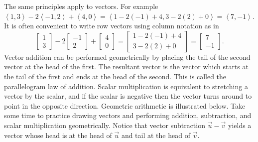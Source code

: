\documentclass[10pt]{article}
\begin{document}
The same principles apply to vectors. For example $\left<1,3\right>-2\left<-1,2\right>+\left<4,0\right> = \left<1-2(-1)+4,3-2(2)+0\right> = \left<7,-1\right>$. It is often convenient to write row vectors using column notation as in 
$$
\begin{bmatrix}1\\3\end{bmatrix}
-2\begin{bmatrix}-1\\ 2\end{bmatrix}
+ \begin{bmatrix}4\\0\end{bmatrix}
= \begin{bmatrix}1-2(-1)+4\\3-2(2)+0\end{bmatrix}
= \begin{bmatrix}7\\-1\end{bmatrix}.
$$
Vector addition can be performed geometrically by placing the tail of the second vector at the head of the first. The resultant vector is the vector which starts at the tail of the first and ends at the head of the second. This is called the parallelogram law of addition. Scalar multiplication is equivalent to stretching a vector by the scalar, and if the scalar is negative then the vector turns around to point in the opposite direction.
Geometric arithmetic is illustrated below. Take some time to practice drawing vectors and performing addition, subtraction, and scalar multiplication geometrically. Notice that vector subtraction $\vec u - \vec v$ yields a vector whose head is at the head of $\vec u$ and tail at the head of $\vec v$.
\end{document}
